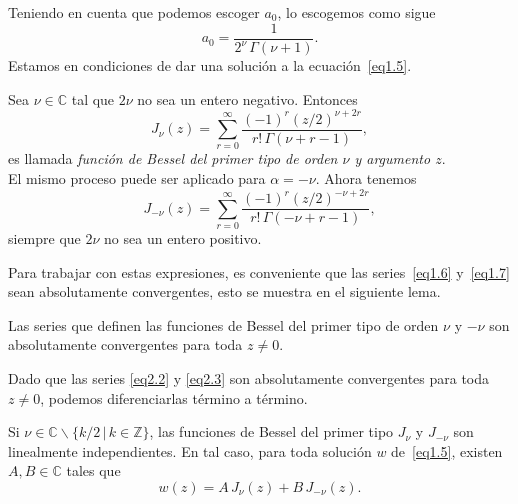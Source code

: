 \documentclass[main.tex]{subfiles}
\begin{document}
Teniendo en cuenta que podemos escoger $a_{0}$, lo escogemos como sigue
\[
  a_{0}=\frac{1}{2^{\nu}\,\Gamma(\nu+1)}.
\]
Estamos en condiciones de dar una solución a la ecuación~\eqref{eq1.5}.
\begin{def.}
  Sea $\nu\in\mathbb{C}$ tal que $2\nu$ no sea un entero negativo. Entonces
  \begin{equation}
    \label{eq1.6}
    J_{\nu}(z)=\sum_{r=0}^{\infty}\frac{(-1)^{r}(z/2)^{\nu+2r}}{r!\,\Gamma(\nu+r-1)},
  \end{equation}
  es llamada \textit{función de Bessel del primer tipo de orden $\nu$ y argumento $z$}.\\
  El mismo proceso puede ser aplicado para $\alpha=-\nu$. Ahora tenemos
  \begin{equation}
    \label{eq1.7}
    J_{-\nu}(z)=\sum_{r=0}^{\infty}\frac{(-1)^{r}(z/2)^{-\nu+2r}}{r!\,\Gamma(-\nu+r-1)},
  \end{equation}
  siempre que $2\nu$ no sea un entero positivo.
\end{def.}
Para trabajar con estas expresiones, es conveniente que las series~\eqref{eq1.6} y~\eqref{eq1.7} sean absolutamente convergentes, esto se muestra en el siguiente lema.
\begin{lema}\label{l1.2} %
  Las series que definen las funciones de Bessel del primer tipo de orden $\nu$ y $-\nu$ son absolutamente convergentes para toda $z\neq0$.
\end{lema}
\obs
  Dado que las series \eqref{eq2.2} y \eqref{eq2.3} son absolutamente convergentes para toda $z\neq0$, podemos diferenciarlas término a término.
\begin{prop}\label{p1.5} %
  Si $\nu\in\mathbb{C}\backslash\{k/2\,|\,k\in\mathbb{Z}\}$, las funciones de Bessel del primer tipo $J_{\nu}$ y $J_{-\nu}$ son linealmente independientes. En tal caso, para toda solución $w$ de~\eqref{eq1.5}, existen $A,B\in\mathbb{C}$ tales que
  \[
    w(z)=A\,J_{\nu}(z)+B\,J_{-\nu}(z).
  \]
\end{prop}
\end{document}
